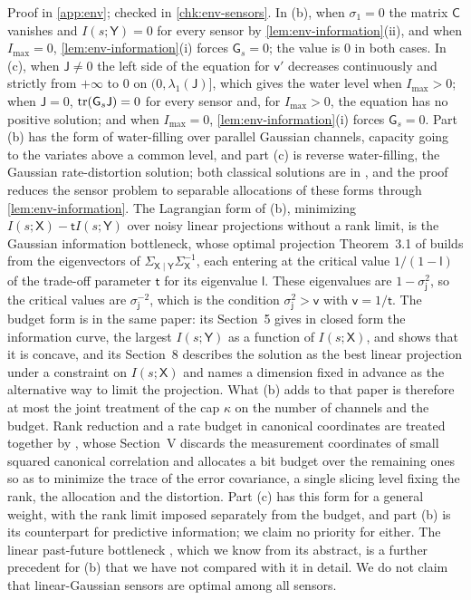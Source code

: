 Proof in \cref{app:env}; checked in \cref{chk:env-sensors}. In (b), when $\sigma_1=0$ the matrix $\mathsf C$ vanishes and $I(s;\mathsf Y)=0$ for every sensor by \cref{lem:env-information}(ii), and when $I_{\max}=0$, \cref{lem:env-information}(i) forces $\mathsf G_s=0$; the value is $0$ in both cases. In (c), when $\mathsf J\neq0$ the left side of the equation for $\mathsf v'$ decreases continuously and strictly from $+\infty$ to $0$ on $(0,\lambda_1(\mathsf J)]$, which gives the water level when $I_{\max}>0$; when $\mathsf J=0$, $\operatorname{tr}(\mathsf G_s\mathsf J)=0$ for every sensor and, for $I_{\max}>0$, the equation has no positive solution; and when $I_{\max}=0$, \cref{lem:env-information}(i) forces $\mathsf G_s=0$. Part (b) has the form of water-filling over parallel Gaussian channels, capacity going to the variates above a common level, and part (c) is reverse water-filling, the Gaussian rate-distortion solution; both classical solutions are in \citet{cover2006elements}, and the proof reduces the sensor problem to separable allocations of these forms through \cref{lem:env-information}. The Lagrangian form of (b), minimizing $I(s;\mathsf X)-\mathsf tI(s;\mathsf Y)$ over noisy linear projections without a rank limit, is the Gaussian information bottleneck, whose optimal projection Theorem~3.1 of \citet{chechik2005information} builds from the eigenvectors of $\Sigma_{\mathsf X\mid\mathsf Y}\Sigma_{\mathsf X}^{-1}$, each entering at the critical value $1/(1-\mathsf l)$ of the trade-off parameter $\mathsf t$ for its eigenvalue $\mathsf l$. These eigenvalues are $1-\sigma_{\mathsf j}^2$, so the critical values are $\sigma_{\mathsf j}^{-2}$, which is the condition $\sigma_{\mathsf j}^2>\mathsf v$ with $\mathsf v=1/\mathsf t$. The budget form is in the same paper: its Section~5 gives in closed form the information curve, the largest $I(s;\mathsf Y)$ as a function of $I(s;\mathsf X)$, and shows that it is concave, and its Section~8 describes the solution as the best linear projection under a constraint on $I(s;\mathsf X)$ and names a dimension fixed in advance as the alternative way to limit the projection. What (b) adds to that paper is therefore at most the joint treatment of the cap $\kappa$ on the number of channels and the budget. Rank reduction and a rate budget in canonical coordinates are treated together by \citet{scharf1998wiener}, whose Section~V discards the measurement coordinates of small squared canonical correlation and allocates a bit budget over the remaining ones so as to minimize the trace of the error covariance, a single slicing level fixing the rank, the allocation and the distortion. Part (c) has this form for a general weight, with the rank limit imposed separately from the budget, and part (b) is its counterpart for predictive information; we claim no priority for either. The linear past-future bottleneck \citep{creutzig2009past}, which we know from its abstract, is a further precedent for (b) that we have not compared with it in detail. We do not claim that linear-Gaussian sensors are optimal among all sensors.

